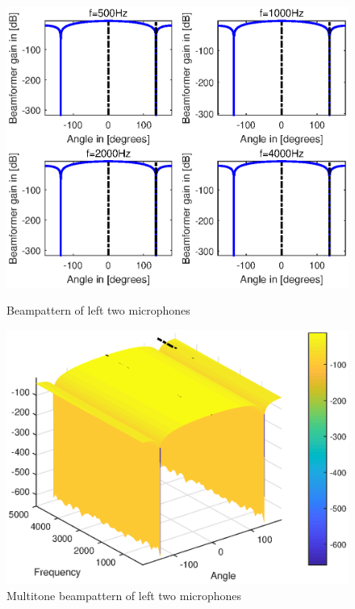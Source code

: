 \documentclass[onecolumn, conference]{IEEEtran}
\begin{document}
\begin{figure}[htbp]
	\begin{minipage}[b]{0.5\linewidth}
		\centerline{\includegraphics[width=1\textwidth]{img/1_a_1.eps}}
		\caption{Beampattern of left two microphones}
		\label{Beampattern of left two microphones135}
	\end{minipage}
	\hfill
	\begin{minipage}[b]{0.5\linewidth}
		\centerline{\includegraphics[width=1\textwidth]{img/1_a_1_multi_135.eps}}
		\caption{Multitone beampattern of left two microphones}
		\label{Multitone beampattern of left two microphones135}
	\end{minipage}
\end{figure}
\end{document}
